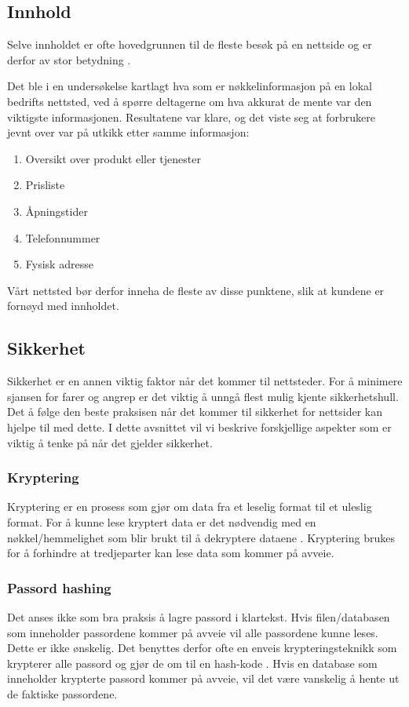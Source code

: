 \subsection{Innhold}
Selve innholdet er ofte hovedgrunnen til de fleste besøk på en nettside og er derfor av stor betydning \cite{thielsch2014ueo}.

Det ble i en undersøkelse \cite{marchant18wdc} kartlagt hva som er nøkkelinformasjon på en lokal bedrifts nettsted, ved å spørre deltagerne om hva akkurat de mente var den viktigste informasjonen. Resultatene var klare, og det viste seg at forbrukere jevnt over var på utkikk etter samme informasjon:
\begin{enumerate}
\item Oversikt over produkt eller tjenester
\item Prisliste
\item Åpningstider
\item Telefonnummer
\item Fysisk adresse
\end{enumerate}

Vårt nettsted bør derfor inneha de fleste av disse punktene, slik at kundene er fornøyd med innholdet.

\subsection{Sikkerhet}
\label{sec:analysis-security}
Sikkerhet er en annen viktig faktor når det kommer til nettsteder. For å minimere sjansen for farer og angrep er det viktig å unngå flest mulig kjente sikkerhetshull. Det å følge den beste praksisen når det kommer til sikkerhet for nettsider kan hjelpe til med dette. I dette avsnittet vil vi beskrive forskjellige aspekter som er viktig å tenke på når det gjelder sikkerhet.
 
\subsubsection{Kryptering}
\label{sec:analysis-security-encryption}
Kryptering er en prosess som gjør om data fra et leselig format til et uleslig format. For å kunne lese kryptert data er det nødvendig med en nøkkel/hemmelighet som blir brukt til å dekryptere dataene \cite[s.~117-118]{NattTomHeine2015Datasikkerhet}. Kryptering brukes for å forhindre at tredjeparter kan lese data som kommer på avveie.
 
\subsubsection{Passord hashing}
\label{sec:analysis-security-password-hashing}
Det anses ikke som bra praksis å lagre passord i klartekst. Hvis filen/databasen som inneholder passordene kommer på avveie vil alle passordene kunne leses. Dette er ikke ønskelig. Det benyttes derfor ofte en enveis krypteringsteknikk som krypterer alle passord og gjør de om til en hash-kode \cite[s.~100-103]{NattTomHeine2015Datasikkerhet}. Hvis en database som inneholder krypterte passord kommer på avveie, vil det være vanskelig å hente ut de faktiske passordene.
 
